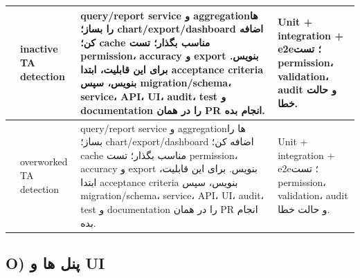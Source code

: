 \documentclass[11pt,a4paper]{article}
\begin{document}
\begin{longtable}{|>{\raggedleft\arraybackslash}p{}|>{\raggedleft\arraybackslash}p{}|>{\raggedleft\arraybackslash}p{}|>{\raggedleft\arraybackslash}p{}|}
259 & inactive TA detection & query/report service و aggregationها را بساز؛ chart/export/dashboard اضافه کن؛ cache مناسب بگذار؛ تست permission، accuracy و export بنویس. برای این قابلیت، ابتدا acceptance criteria بنویس، سپس migration/schema، service، API، UI، audit، test و documentation را در همان PR انجام بده. & Unit + integration + e2e؛ تست permission، validation، audit و حالت خطا. \\ \hline
260 & overworked TA detection & query/report service و aggregationها را بساز؛ chart/export/dashboard اضافه کن؛ cache مناسب بگذار؛ تست permission، accuracy و export بنویس. برای این قابلیت، ابتدا acceptance criteria بنویس، سپس migration/schema، service، API، UI، audit، test و documentation را در همان PR انجام بده. & Unit + integration + e2e؛ تست permission، validation، audit و حالت خطا. \\ \hline
\end{longtable}
\subsection{O) پنل ها و UI}
\end{document}
